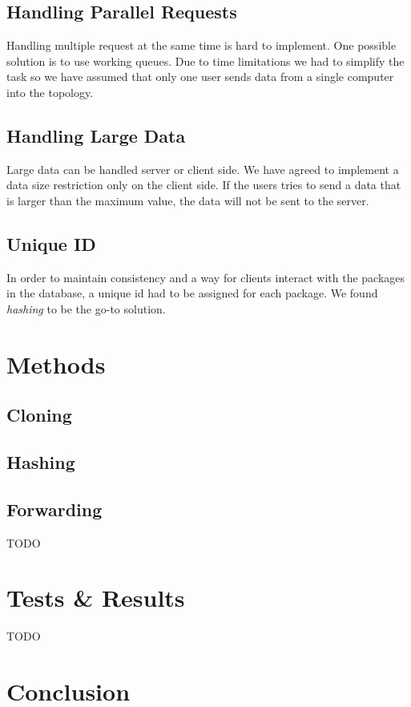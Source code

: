 \documentclass[sigconf,natbib=false]{acmart}
\begin{document}
\subsection{Handling Parallel Requests}
Handling multiple request at the same time is hard to implement. One possible solution is to use working queues. Due to time limitations we had to simplify the task so we have assumed that only one user sends data from a single computer into the topology.
\subsection{Handling Large Data}
Large data can be handled server or client side. We have agreed to implement a data size restriction only on the client side. If the users tries to send a data that is larger than the maximum value, the data will not be sent to the server.
\subsection{Unique ID}
In order to maintain consistency and a way for clients interact with the packages in the database, a unique id had to be assigned for each package. We found \textit{hashing} to be the go-to solution.
\section{Methods}

\subsection{Cloning}
\cite{cloning1} \cite{cloning2}

\subsection{Hashing}
\cite{hashing1} \cite{hashing2}
\subsection{Forwarding}
TODO
\section{Tests \& Results}

TODO

\section{Conclusion}
\end{document}

